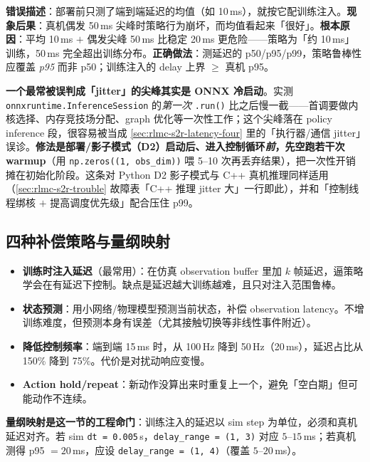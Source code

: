 \begin{pitfall}
\textbf{错误描述}：部署前只测了端到端延迟的均值（如 10\,ms），就按它配训练注入。\textbf{现象后果}：真机偶发 50\,ms 尖峰时策略行为崩坏，而均值看起来「很好」。\textbf{根本原因}：平均 10\,ms $+$ 偶发尖峰 50\,ms 比稳定 20\,ms 更危险——策略为「约 10\,ms」训练，50\,ms 完全超出训练分布。\textbf{正确做法}：测延迟的 p50/p95/p99，策略鲁棒性应覆盖 \emph{p95} 而非 p50；训练注入的 delay 上界 $\ge$ 真机 p95。
\end{pitfall}

\begin{finenote}
\textbf{一个最常被误判成「jitter」的尖峰其实是 ONNX 冷启动}。实测 \verb|onnxruntime.InferenceSession| 的\emph{第一次} \verb|.run()| 比之后慢一截——首调要做内核选择、内存竞技场分配、graph 优化等一次性工作；这个尖峰落在 policy inference 段，很容易被当成 \cref{sec:rlmc-s2r-latency-four} 里的「执行器/通信 jitter」误诊。\textbf{修法是部署/影子模式（D2）启动后、进入控制循环\emph{前}，先空跑若干次 warmup}（用 \verb|np.zeros((1, obs_dim))| 喂 5--10 次再丢弃结果），把一次性开销摊在初始化阶段。这条对 Python D2 影子模式与 C++ 真机推理同样适用（\cref{sec:rlmc-s2r-trouble} 故障表「C++ 推理 jitter 大」一行即此），并和「控制线程绑核 $+$ 提高调度优先级」配合压住 p99。
\end{finenote}

\subsection{四种补偿策略与量纲映射}
\label{sec:rlmc-s2r-latency-comp}

\begin{itemize}
  \item \textbf{训练时注入延迟}（最常用）：在仿真 observation buffer 里加 $k$ 帧延迟，逼策略学会在有延迟下控制。缺点是延迟越大训练越难，且只对注入范围鲁棒。
  \item \textbf{状态预测}：用小网络/物理模型预测当前状态，补偿 observation latency。不增训练难度，但预测本身有误差（尤其接触切换等非线性事件附近）。
  \item \textbf{降低控制频率}：端到端 15\,ms 时，从 100\,Hz 降到 50\,Hz（20\,ms），延迟占比从 150\% 降到 75\%。代价是对扰动响应变慢。
  \item \textbf{Action hold/repeat}：新动作没算出来时重复上一个，避免「空白期」但可能动作不连续。
\end{itemize}

\textbf{量纲映射是这一节的工程命门}：训练注入的延迟以 sim step 为单位，必须和真机延迟对齐。若 sim \verb|dt = 0.005|\,s，\verb|delay_range = (1, 3)| 对应 $5$--$15$\,ms；若真机测得 p95 $=20$\,ms，应设 \verb|delay_range = (1, 4)|（覆盖 $5$--$20$\,ms）。

